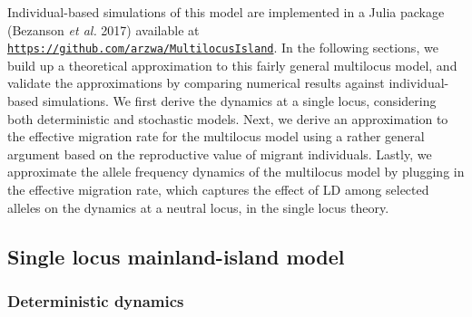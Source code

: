 \documentclass[
  11pt,
]{article}
\begin{document}
Individual-based simulations of this model are implemented in a Julia
package (Bezanson \emph{et al.} 2017) available at
\href{https://github.com/arzwa/MultilocusIsland}{\texttt{https://github.com/arzwa/MultilocusIsland}}.
In the following sections, we build up a theoretical approximation to
this fairly general multilocus model, and validate the approximations by
comparing numerical results against individual-based simulations. We
first derive the dynamics at a single locus, considering both
deterministic and stochastic models. Next, we derive an approximation to
the effective migration rate for the multilocus model using a rather
general argument based on the reproductive value of migrant individuals.
Lastly, we approximate the allele frequency dynamics of the multilocus
model by plugging in the effective migration rate, which captures the
effect of LD among selected alleles on the dynamics at a neutral locus,
in the single locus theory.

\hypertarget{single-locus-mainland-island-model}{%
\subsection{Single locus mainland-island
model}\label{single-locus-mainland-island-model}}

\hypertarget{sec:sldet}{%
\subsubsection{Deterministic dynamics}\label{sec:sldet}}
\end{document}
